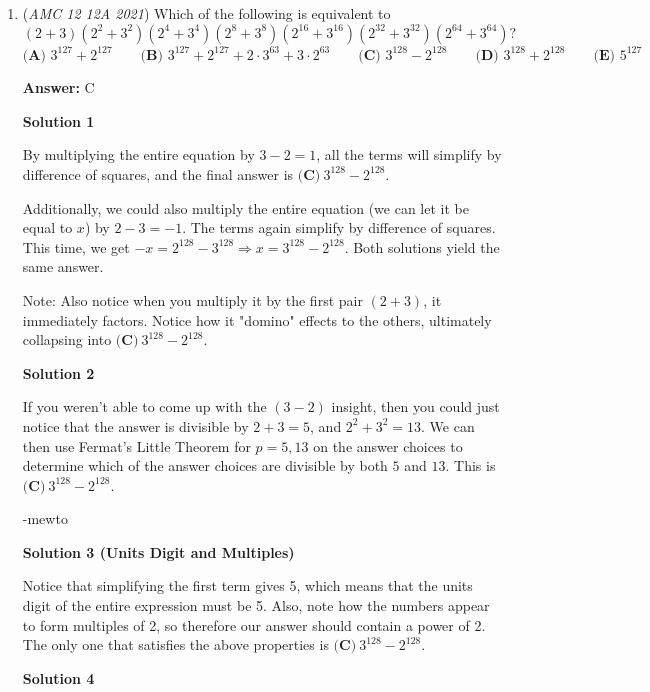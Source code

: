 \begin{enumerate}
	\item (\textit{AMC 12 12A 2021}) Which of the following is equivalent to
 \[(2+3)(2^2+3^2)(2^4+3^4)(2^8+3^8)(2^{16}+3^{16})(2^{32}+3^{32})(2^{64}+3^{64})?\]
$\textbf{(A) }3^{127}+2^{127} \qquad \textbf{(B) }3^{127}+2^{127}+2\cdot 3^{63}+3\cdot 2^{63} \qquad \textbf{(C) }3^{128}-2^{128} \qquad \textbf{(D) }3^{128}+2^{128} \qquad \textbf{(E) }5^{127}$

 \textbf{Answer: }C



\textbf{Solution 1}

By multiplying the entire equation by $3-2=1$, all the terms will simplify by difference of squares, and the final answer is $\boxed{\textbf{(C)} ~3^{128}-2^{128}}$.

 Additionally, we could also multiply the entire equation (we can let it be equal to $x$) by $2-3=-1$. The terms again simplify by difference of squares. This time, we get $-x=2^{128}-3^{128} \Rightarrow x=3^{128}-2^{128}$. Both solutions yield the same answer.

 Note: Also notice when you multiply it by the first pair $(2+3)$, it immediately factors. Notice how it "domino" effects to the others, ultimately collapsing into $\boxed{\textbf{(C)} ~3^{128}-2^{128}}$.

 



\textbf{Solution 2}

If you weren't able to come up with the $(3 - 2)$ insight, then you could just notice that the answer is divisible by $2 + 3 = 5$, and $2^2 + 3^2 = 13$. We can then use Fermat's Little Theorem for $p = 5, 13$ on the answer choices to determine which of the answer choices are divisible by both $5$ and $13$. This is $\boxed{\textbf{(C)} ~3^{128}-2^{128}}$.

 -mewto

 



\textbf{Solution 3 (Units Digit and Multiples)}

Notice that simplifying the first term gives 5, which means that the units digit of the entire expression must be 5. Also, note how the numbers appear to form multiples of 2, so therefore our answer should contain a power of 2. The only one that satisfies the above properties is $\boxed{\textbf{(C)} ~3^{128}-2^{128}}$.

 



\textbf{Solution 4}


\end{enumerate}

